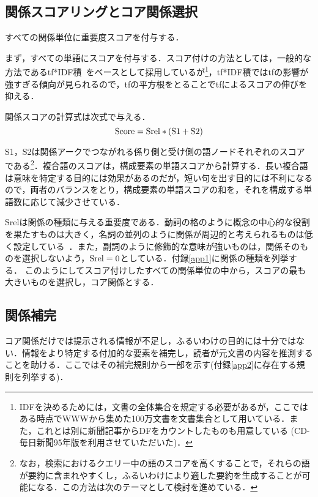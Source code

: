 \subsection{関係スコアリングとコア関係選択}
すべての関係単位に重要度スコアを付与する．

まず，すべての単語にスコアを付与する．スコア付けの方法としては，一般的な方法であるtf*IDF積~\cite{salton89}をベースとして採用しているが\footnote{IDFを決めるためには，文書の全体集合を規定する必要があるが，ここではある時点でWWWから集めた100万文書を文書集合として用いている．また，これとは別に新聞記事からDFをカウントしたものも用意している (CD-毎日新聞95年版を利用させていただいた)．}，tf*IDF積ではtfの影響が強すぎる傾向が見られるので，tfの平方根をとることでtfによるスコアの伸びを抑える．

関係スコアの計算式は次式で与える．
\begin{equation}
 {\rm Score} = {\rm Srel} \ast ({\rm S1} + {\rm S2}) \label{eq-score}
\end{equation}

S1，S2は関係アークでつながれる係り側と受け側の語ノードそれぞれのスコアである\footnote{なお，検索におけるクエリー中の語のスコアを高くすることで，それらの語が要約に含まれやすくし，ふるいわけにより適した要約を生成することが可能になる．この方法は次のテーマとして検討を進めている．}．複合語のスコアは，構成要素の単語スコアから計算する．長い複合語は意味を特定する目的には効果があるのだが，短い句を出す目的には不利になるので，両者のバランスをとり，構成要素の単語スコアの和を，それを構成する単語数に応じて減少させている．

Srelは関係の種類に与える重要度である．動詞の格のように概念の中心的な役割を果たすものは大きく，名詞の並列のように関係が周辺的と考えられるものは低く設定している~\cite{oka99}．また，副詞のように修飾的な意味が強いものは，関係そのものを選択しないよう，${\rm Srel} = 0$としている．付録\ref{app1}に関係の種類を列挙する．
このようにしてスコア付けしたすべての関係単位の中から，スコアの最も大きいものを選択し，コア関係とする．

\subsection{関係補完}
コア関係だけでは提示される情報が不足し，ふるいわけの目的には十分ではない．情報をより特定する付加的な要素を補完し，読者が元文書の内容を推測することを助ける．ここではその補完規則から一部を示す(付録\ref{app2}に存在する規則を列挙する)．

